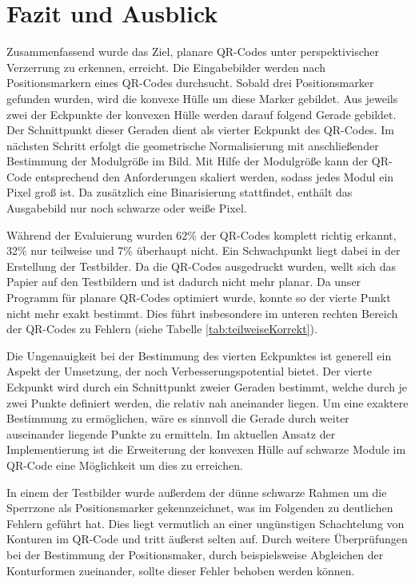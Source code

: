 \documentclass[a4paper, oneside, 12pt]{article}
\begin{document}
\newpage
\section{Fazit und Ausblick}
Zusammenfassend wurde das Ziel, planare QR-Codes unter perspektivischer Verzerrung zu erkennen, erreicht. Die Eingabebilder werden nach Positionsmarkern eines QR-Codes durchsucht. Sobald drei Positionsmarker gefunden wurden, wird die konvexe Hülle um diese Marker gebildet. Aus jeweils zwei der Eckpunkte der konvexen Hülle werden darauf folgend Gerade gebildet. Der Schnittpunkt dieser Geraden dient als vierter Eckpunkt des QR-Codes. Im nächsten Schritt erfolgt die geometrische Normalisierung mit anschließender Bestimmung der Modulgröße im Bild. Mit Hilfe der Modulgröße kann der QR-Code entsprechend den Anforderungen skaliert werden, sodass jedes Modul ein Pixel groß ist. Da zusätzlich eine Binarisierung stattfindet, enthält das Ausgabebild nur noch schwarze oder weiße Pixel. 

Während der Evaluierung wurden 62\% der QR-Codes komplett richtig erkannt, 32\% nur teilweise und 7\% überhaupt nicht. Ein Schwachpunkt liegt dabei in der Erstellung der Testbilder. Da die QR-Codes ausgedruckt wurden, wellt sich das Papier auf den Testbildern und ist dadurch nicht mehr planar. Da unser Programm für planare QR-Codes optimiert wurde, konnte so der vierte Punkt nicht mehr exakt bestimmt. Dies führt insbesondere im unteren rechten Bereich der QR-Codes zu Fehlern (siehe Tabelle \ref{tab:teilweiseKorrekt}). 

Die Ungenauigkeit bei der Bestimmung des vierten Eckpunktes ist generell ein Aspekt der Umsetzung, der noch Verbesserungspotential bietet. Der vierte Eckpunkt wird durch ein Schnittpunkt zweier Geraden bestimmt, welche durch je zwei Punkte definiert werden, die relativ nah aneinander liegen. Um eine exaktere Bestimmung zu ermöglichen, wäre es sinnvoll die Gerade durch weiter auseinander liegende Punkte zu ermitteln. Im aktuellen Ansatz der Implementierung ist die Erweiterung der konvexen Hülle auf schwarze Module im QR-Code eine Möglichkeit um dies zu erreichen.

In einem der Testbilder wurde außerdem der dünne schwarze Rahmen um die Sperrzone als Positionsmarker gekennzeichnet, was im Folgenden zu deutlichen Fehlern geführt hat. Dies liegt vermutlich an einer ungünstigen Schachtelung von Konturen im QR-Code und tritt äußerst selten auf. Durch weitere Überprüfungen bei der Bestimmung der Positionsmaker, durch beispielsweise Abgleichen der Konturformen zueinander, sollte dieser Fehler behoben werden können.
\end{document}
